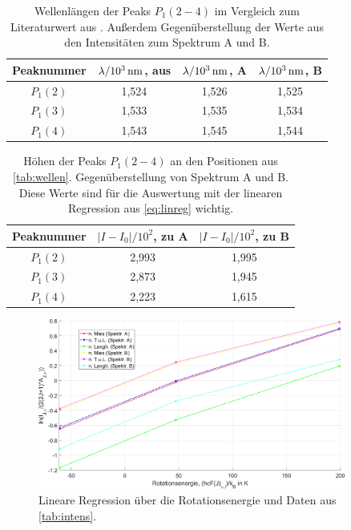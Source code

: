 \documentclass[numbers=noenddot,a4paper,notitlepage,twoside,BCOR15mm]{scrartcl}
\newcommand{\tenpo}[1]{ 10^{#1}}
\newcommand{\ix}[1]{_\text{#1}}
\begin{document}
			\begin{table}
				\centering
				\begin{tabular}{c|c|c|c}
					Peaknummer & $\lambda/\unit[\tenpo{3}]{nm}$, aus \cite{EMAUGreifswaldOHRot} & $\lambda/\unit[\tenpo{3}]{nm}$, A & $\lambda/\unit[\tenpo{3}]{nm}$, B\\
					\hline $P\ix{1}(2)$ & 1,524 & 1,526 & 1,525 \\
					\hline $P\ix{1}(3)$ & 1,533 & 1,535 & 1,534 \\
					\hline $P\ix{1}(4)$ & 1,543 & 1,545 & 1,544
				\end{tabular}
				\caption{Wellenlängen der Peaks $P\ix{1}(2-4)$ im Vergleich zum Literaturwert aus \cite{EMAUGreifswaldOHRot}. Außerdem Gegenüberstellung der Werte aus den Intensitäten zum Spektrum A und B.}
				\label{tab:wellen}
			\end{table}

			\begin{table}
				\centering
				\begin{tabular}{c|c|c}
					Peaknummer & $|I-I\ix{0}|/\tenpo{2}$, zu A & $|I-I\ix{0}|/\tenpo{2}$, zu B\\
					\hline $P\ix{1}(2)$ & 2,993 & 1,995 \\
					\hline $P\ix{1}(3)$ & 2,873 & 1,945 \\
					\hline $P\ix{1}(4)$ & 2,223 & 1,615
				\end{tabular}
				\caption{Höhen der Peaks $P\ix{1}(2-4)$ an den Positionen aus \autoref{tab:wellen}. Gegenüberstellung von Spektrum A und B. Diese Werte sind für die Auswertung mit der linearen Regression aus \autoref{eq:linreg} wichtig.}
				\label{tab:intens}
			\end{table}

				\begin{figure}
					\centering
					\includegraphics[width=0.9\textwidth]{linear_reg.png}
					\caption{Lineare Regression über die Rotationsenergie und Daten aus \autoref{tab:intens}.}
					\label{img:regress}
				\end{figure}
\end{document}
